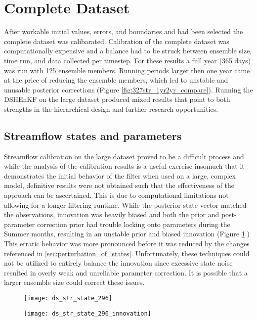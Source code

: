 \section{Complete Dataset}

After workable initial values, errors, and boundaries and had been selected the complete dataset was calibarated. Calibration of the complete dataset was computationally expensive and a balance had to be struck between ensemble size, time run, and data collected per timestep. For these results a full year (365 days) was run with 125 ensemble members. Running periods larger then one year came at the price of reducing the ensemble members, which led to unstable and unusable posterior corrections (Figure \ref{fig:327str_1yr2yr_compare}). Running the DSHEnKF on the large dataset produced mixed results that point to both strengths in the hierarchical design and further research opportunities.

\subsection{Streamflow states and parameters}

Streamflow calibration on the large dataset proved to be a difficult process and while the analysis of the calibration results is a useful exercise insomuch that it demonstrates the initial behavior of the filter when used on a large, complex model, definitive results were not obtained such that the effectiveness of the approach can be ascertained. This is due to computational limitations not allowing for a longer filtering runtime. While the posterior state vector matched the observations, innovation was heavily biased and both the prior and post-parameter correction prior had trouble locking onto parameters during the Summer months, resulting in an unstable prior and biased innovation (Figure \ref{fig:str_state_296}.) This erratic behavior was more pronounced before it was reduced by the changes referenced in \autoref{sec:perturbation_of_states}. Unfortunately, these techniques could not be utilized to entirely balance the innovation since excessive state noise resulted in overly weak and unreliable parameter correction. It is possible that a larger ensemble size could correct these issues.


\begin{figure}
\centering
\begin{minipage}{.48\textwidth}
  \centering
  \texttt{[image: ds\_str\_state\_296]}
  \label{fig:296str}
\end{minipage}%
\begin{minipage}{.48\textwidth}
  \centering
  \texttt{[image: ds\_str\_state\_296\_innovation]}
  \label{fig:296strinnovation}
\end{minipage}
\label{fig:str_state_296}
\end{figure}


